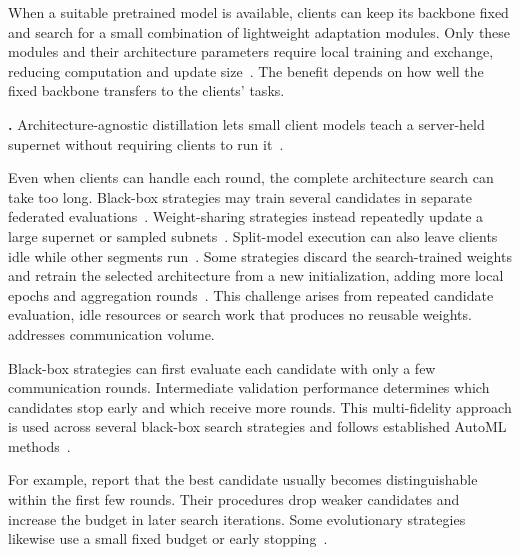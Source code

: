  When a suitable pretrained model is available, clients can keep its backbone fixed and search for a small combination of lightweight adaptation modules. Only these modules and their architecture parameters require local training and exchange, reducing computation and update size~\cite{fednaspet_2023}. The benefit depends on how well the fixed backbone transfers to the clients' tasks.

\noindent\textbf{.} Architecture-agnostic distillation lets small client models teach a server-held supernet without requiring clients to run it~\cite{hapfnas_2025}.


Even when clients can handle each round, the complete architecture search can take too long. Black-box strategies may train several candidates in separate federated evaluations~\cite{decnas_2022,rt_fed_evo_nas_2020}. Weight-sharing strategies instead repeatedly update a large supernet or sampled subnets~\cite{fednas_2021,superfednas_2024}. Split-model execution can also leave clients idle while other segments run~\cite{nasfly_2024}. Some strategies discard the search-trained weights and retrain the selected architecture from a new initialization, adding more local epochs and aggregation rounds~\cite{medical_image_segmentation_fednas_2024,privacy_preserving_fednas_for_edge_2025}. This challenge arises from repeated candidate evaluation, idle resources or search work that produces no reusable weights.  addresses communication volume.

 Black-box strategies can first evaluate each candidate with only a few communication rounds. Intermediate validation performance determines which candidates stop early and which receive more rounds. This multi-fidelity approach is used across several black-box search strategies and follows established AutoML methods~\cite{automl_book_hpo_2019}.

For example, \cite{decnas_2022,fednas_over_hetero_mobile_devices_2022} report that the best candidate usually becomes distinguishable within the first few rounds. Their procedures drop weaker candidates and increase the budget in later search iterations. Some evolutionary strategies likewise use a small fixed budget or early stopping~\cite{multi_objective_evo_fl_2020,gpt4-boosted_pso_fednas_2024}.

